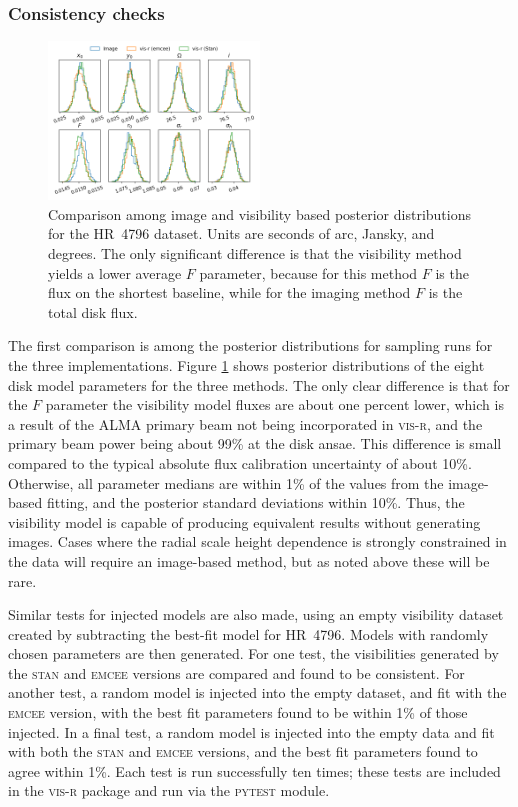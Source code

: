 \documentclass[fleqn,usenatbib]{mnras}
\begin{document}
\subsubsection{Consistency checks}

\begin{figure}
    \centering
    \includegraphics[width=0.5\textwidth]{comp.png}
    \caption{Comparison among image and visibility based posterior distributions for the HR~4796 dataset. Units are seconds of arc, Jansky, and degrees. The only significant difference is that the visibility method yields a lower average $F$ parameter, because for this method $F$ is the flux on the shortest baseline, while for the imaging method $F$ is the total disk flux.}
    \label{fig:comp}
\end{figure}

The first comparison is among the posterior distributions for sampling runs for the three implementations. Figure \ref{fig:comp} shows posterior distributions of the eight disk model parameters for the three methods. The only clear difference is that for the $F$ parameter the visibility model fluxes are about one percent lower, which is a result of the ALMA primary beam not being incorporated in \textsc{vis-r}, and the primary beam power being about 99\% at the disk ansae. This difference is small compared to the typical absolute flux calibration uncertainty of about 10\%. Otherwise, all parameter medians are within 1\% of the values from the image-based fitting, and the posterior standard deviations within 10\%. Thus, the visibility model is capable of producing equivalent results without generating images. Cases where the radial scale height dependence is strongly constrained in the data will require an image-based method, but as noted above these will be rare.

Similar tests for injected models are also made, using an empty visibility dataset created by subtracting the best-fit model for HR~4796. Models with randomly chosen parameters are then generated. For one test, the visibilities generated by the \textsc{stan} and \textsc{emcee} versions are compared and found to be consistent. For another test, a random model is injected into the empty dataset, and fit with the \textsc{emcee} version, with the best fit parameters found to be within 1\% of those injected. In a final test, a random model is injected into the empty data and fit with both the \textsc{stan} and \textsc{emcee} versions, and the best fit parameters found to agree within 1\%. Each test is run successfully ten times; these tests are included in the \textsc{vis-r} package and run via the \textsc{pytest} module.
\end{document}
